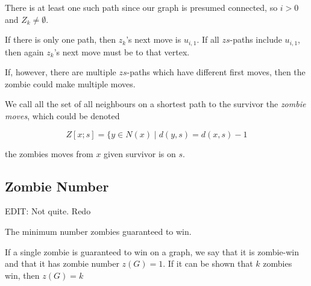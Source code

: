 There is at least one such path since our graph is presumed connected,
so $i > 0$ and $Z_k \neq \emptyset$.

If there is only one path, then $z_k$'s next move is $u_{i, 1}$. If all $zs$-paths
include $u_{i,1}$, then again $z_k$'s next move must be to that vertex.

If, however, there are multiple $zs$-paths which have different first moves,
then the zombie could make multiple moves.

We call all the set of all neighbours on
a shortest path to the survivor the \textit{zombie moves}, which could be denoted

\[ Z[x; s] = \{ y \in N(x) \mid d(y, s) = d(x, s) - 1 \]

the zombies moves from $x$ given survivor is on $s$.

\subsection{Zombie Number}

EDIT: Not quite. Redo

The minimum number zombies guaranteed to win.

If a single zombie is guaranteed to win on a graph, we say that it is zombie-win
and that it has zombie number $z(G) = 1$. If it can be shown that $k$ zombies win,
then $z(G) = k$
